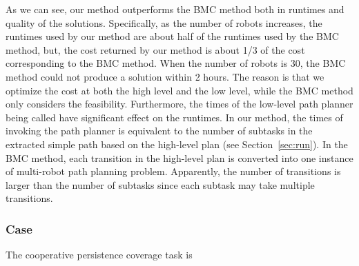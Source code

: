 \documentclass[Afour,sageh,times]{sagej}
\newcommand{\RNum}[1]{\uppercase\expandafter{\romannumeral #1\relax}}
\begin{document}
{As we can see, our method outperforms the BMC method both in runtimes and quality of the solutions. Specifically, as the number of robots increases, the runtimes used by our method are about half of the runtimes used by the BMC method, but, the cost returned by our method is about 1/3 of the cost corresponding to the BMC method. When the number of robots is 30, the BMC method could not produce a solution within 2 hours. The reason is that we optimize the cost at both the high level and the low level, while the BMC method only considers the feasibility. Furthermore, the times of the low-level path planner being called have significant effect on the runtimes. In our method, the times of invoking the path planner is equivalent to the number of subtasks in the extracted simple path based on the high-level plan (see Section~\ref{sec:run}). In the BMC method, each transition in the high-level plan is converted into one instance of multi-robot path planning problem. Apparently, the number of transitions is larger than the number of subtasks since each subtask may take multiple transitions.



\subsubsection{Case \RNum{1}} {The cooperative persistence coverage task is}

}
\end{document}
